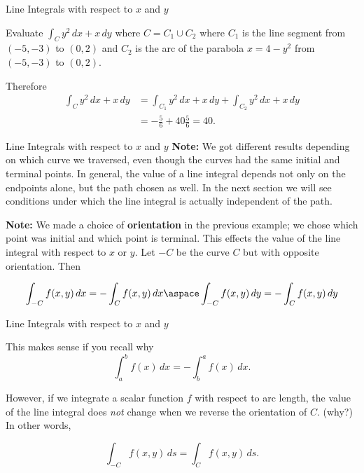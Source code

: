 \documentclass[11pt,english,
handout
]{beamer}
\begin{document}
\begin{frame}[t]{Line Integrals with respect to $x$ and $y$}
\small 
\begin{example}
Evaluate $\displaystyle \int_Cy^2\,dx+x\,dy$ where $C=C_1\cup C_2$ where $C_1$ is the line segment from $(-5,-3)$ to $(0,2)$ and $C_2$ is the arc of the parabola $x=4-y^2$ from $(-5,-3)$ to $(0,2)$.

\lspace
Therefore
\begin{align*}
\int_Cy^2\,dx+x\,dy&=\int_{C_1}y^2\,dx+x\,dy+\int_{C_2}y^2\,dx+x\,dy\\[2mm]
&=-\frac{5}{6}+40\frac{5}{6}=40.
\end{align*}
\end{example}
\end{frame}











\begin{frame}[t]{Line Integrals with respect to $x$ and $y$}
\small 
\textbf{Note:} We got different results depending on which curve we traversed, even though the curves had the same initial and terminal points. \pause In general, the value of a line integral depends not only on the endpoints alone, but the path chosen as well. In the next section we will see conditions under which the line integral is actually independent of the path.\pause

\lspace
\textbf{Note:} We made a choice of \textbf{orientation} in the previous example; we chose which point was initial and which point is terminal. \pause This effects the value of the line integral with respect to $x$ or $y$. \pause Let $-C$ be the curve $C$ but with opposite orientation. Then

\[
\int_{-C}f(x,y)\,dx=-\int_Cf(x,y)\,dx\aspace \int_{-C}f(x,y)\,dy=-\int_Cf(x,y)\,dy
\] 
\end{frame}











\begin{frame}[t]{Line Integrals with respect to $x$ and $y$}
\small 

This makes sense if you recall why 
\[
\int_a^bf(x)\,dx=-\int_b^af(x)\,dx.
\]\pause 

However, if we integrate a scalar function $f$ with respect to arc length, the value of the line integral does \textit{not} change when we reverse the orientation of $C$. (why?) In other words,

\[
\int_{-C}f(x,y)\,ds=\int_Cf(x,y)\,ds.
\]
\end{frame}
\end{document}
